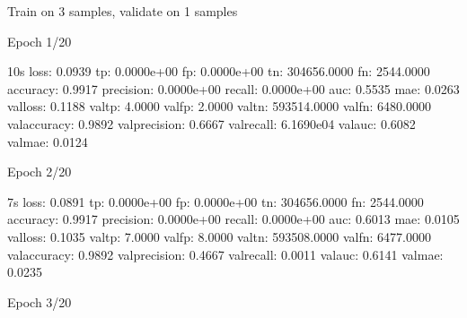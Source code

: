 \documentclass[letterpaper,10pt,english]{sphinxmanual}
\begin{document}
\begin{sphinxVerbatim}[commandchars=\\\{\}]
Train on 3 samples, validate on 1 samples
\end{sphinxVerbatim}

\begin{sphinxVerbatim}[commandchars=\\\{\}]
Epoch 1/20
\end{sphinxVerbatim}

\begin{sphinxVerbatim}[commandchars=\\\{\}]
 \PYGZhy{} 10s \PYGZhy{} loss: 0.0939 \PYGZhy{} tp: 0.0000e+00 \PYGZhy{} fp: 0.0000e+00 \PYGZhy{} tn: 304656.0000 \PYGZhy{} fn: 2544.0000 \PYGZhy{} accuracy: 0.9917 \PYGZhy{} precision: 0.0000e+00 \PYGZhy{} recall: 0.0000e+00 \PYGZhy{} auc: 0.5535 \PYGZhy{} mae: 0.0263 \PYGZhy{} val\PYGZus{}loss: 0.1188 \PYGZhy{} val\PYGZus{}tp: 4.0000 \PYGZhy{} val\PYGZus{}fp: 2.0000 \PYGZhy{} val\PYGZus{}tn: 593514.0000 \PYGZhy{} val\PYGZus{}fn: 6480.0000 \PYGZhy{} val\PYGZus{}accuracy: 0.9892 \PYGZhy{} val\PYGZus{}precision: 0.6667 \PYGZhy{} val\PYGZus{}recall: 6.1690e\PYGZhy{}04 \PYGZhy{} val\PYGZus{}auc: 0.6082 \PYGZhy{} val\PYGZus{}mae: 0.0124
\end{sphinxVerbatim}

\begin{sphinxVerbatim}[commandchars=\\\{\}]
Epoch 2/20
\end{sphinxVerbatim}

\begin{sphinxVerbatim}[commandchars=\\\{\}]
 \PYGZhy{} 7s \PYGZhy{} loss: 0.0891 \PYGZhy{} tp: 0.0000e+00 \PYGZhy{} fp: 0.0000e+00 \PYGZhy{} tn: 304656.0000 \PYGZhy{} fn: 2544.0000 \PYGZhy{} accuracy: 0.9917 \PYGZhy{} precision: 0.0000e+00 \PYGZhy{} recall: 0.0000e+00 \PYGZhy{} auc: 0.6013 \PYGZhy{} mae: 0.0105 \PYGZhy{} val\PYGZus{}loss: 0.1035 \PYGZhy{} val\PYGZus{}tp: 7.0000 \PYGZhy{} val\PYGZus{}fp: 8.0000 \PYGZhy{} val\PYGZus{}tn: 593508.0000 \PYGZhy{} val\PYGZus{}fn: 6477.0000 \PYGZhy{} val\PYGZus{}accuracy: 0.9892 \PYGZhy{} val\PYGZus{}precision: 0.4667 \PYGZhy{} val\PYGZus{}recall: 0.0011 \PYGZhy{} val\PYGZus{}auc: 0.6141 \PYGZhy{} val\PYGZus{}mae: 0.0235
\end{sphinxVerbatim}

\begin{sphinxVerbatim}[commandchars=\\\{\}]
Epoch 3/20
\end{sphinxVerbatim}
\end{document}

